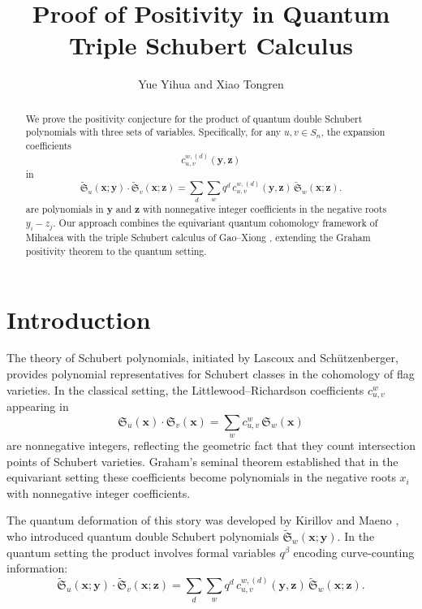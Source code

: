 \documentclass[12pt]{amsart}
\title{Proof of Positivity in Quantum Triple Schubert Calculus}
\author{Yue Yihua and Xiao Tongren}
\begin{document}
\maketitle
\begin{abstract}
We prove the positivity conjecture for the product of quantum double Schubert polynomials with three sets of variables. Specifically, for any $u, v\in S_n$, the expansion coefficients
\[
c_{u,v}^{w,(d)}(\mathbf{y},\mathbf{z})
\]
in
\[
\widetilde{\mathfrak{S}}_u(\mathbf{x};\mathbf{y})\cdot\widetilde{\mathfrak{S}}_v(\mathbf{x};\mathbf{z})
= \sum_d \sum_w q^d\, c_{u,v}^{w,(d)}(\mathbf{y},\mathbf{z})\,
\widetilde{\mathfrak{S}}_w(\mathbf{x};\mathbf{z}).
\]
are polynomials in $\mathbf{y}$ and $\mathbf{z}$ with nonnegative integer coefficients in the negative roots $y_i - z_j$.
Our approach combines the equivariant quantum cohomology framework of Mihalcea \cite{Mihalcea} with the triple Schubert calculus of Gao--Xiong \cite{GX2025}, extending the Graham positivity theorem \cite{Gr} to the quantum setting.
\end{abstract}

\section{Introduction}
\label{sec:introduction}

The theory of Schubert polynomials, initiated by Lascoux and Sch\"utzenberger, provides polynomial representatives for Schubert classes in the cohomology of flag varieties. In the classical setting, the Littlewood--Richardson coefficients $c_{u,v}^w$ appearing in
\[
\mathfrak{S}_u(\mathbf{x})\cdot\mathfrak{S}_v(\mathbf{x})
= \sum_w c_{u,v}^w\,\mathfrak{S}_w(\mathbf{x})
\label{eq:ClassicalProduct}
\]
are nonnegative integers, reflecting the geometric fact that they count intersection points of Schubert varieties. Graham's seminal theorem \cite{Gr} established that in the equivariant setting these coefficients become polynomials in the negative roots $x_i$ with nonnegative integer coefficients.

The quantum deformation of this story was developed by Kirillov and Maeno \cite{KM}, who introduced quantum double Schubert polynomials $\widetilde{\mathfrak{S}}_w(\mathbf{x};\mathbf{y})$.
In the quantum setting the product involves formal variables $q^\beta$ encoding curve-counting information:
\begin{equation}
\widetilde{\mathfrak{S}}_u(\mathbf{x};\mathbf{y})\cdot\widetilde{\mathfrak{S}}_v(\mathbf{x};\mathbf{z})
= \sum_d \sum_w q^d\, c_{u,v}^{w,(d)}(\mathbf{y},\mathbf{z})\,
\widetilde{\mathfrak{S}}_w(\mathbf{x};\mathbf{z}).
\label{eq:QuantumProduct}
\end{equation}
\end{document}

